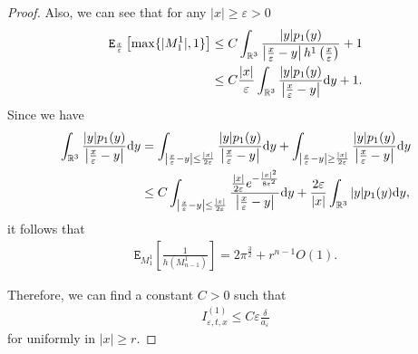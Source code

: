 \documentclass[10pt,a4paper]{amsart}
\newcommand{\R}{{\mathbb{R}}}
\newcommand{\dd}{\text{\rm d}}             %
\newcommand{\e}{\varepsilon}
\begin{document}
\begin{proof}
Also, we can see that for any $|x|\geq \e>0$ \begin{align*}
\mathtt{E}_{\frac{x}{\e}}\left[\max\{|M_1^1|,1\}\right]&\leq C\int_{\R^3}\frac{|y|p_1(y)}{\left|\frac{x}{\e}-y\right|h^1\left(\frac{x}{\e}\right)}+1\\
&\leq C\frac{|x|}{\e}\int_{\R^3}\frac{|y|p_1(y)}{\left|\frac{x}{\e}-y\right|}\dd y+1.
\end{align*}
Since we have \begin{align*}
\int_{\R^3}\frac{|y|p_1(y)}{\left|\frac{x}{\e}-y\right|}\dd y&=\int_{\left|\frac{x}{\e}-y\right|\leq \frac{|x|}{2\e}}\frac{|y|p_1(y)}{\left|\frac{x}{\e}-y\right|}\dd y+\int_{\left|\frac{x}{\e}-y\right|\geq \frac{|x|}{2\e}}\frac{|y|p_1(y)}{\left|\frac{x}{\e}-y\right|}\dd y\\
&\leq C\int_{\left|\frac{x}{\e}-y\right|\leq \frac{|x|}{2\e}}\frac{\frac{|x|}{2\e}e^{-\frac{|x|^2}{8\e^2}}}{\left|\frac{x}{\e}-y\right|}\dd y+\frac{2\e}{|x|}\int_{\R^3}|y|p_1(y)\dd y,
\end{align*}
it follows that \begin{align}
\mathtt{E}_{M_1^1}\left[\frac{1}{h(M_{n-1}^{1})}\right]=2\pi^\frac{3}{2}+r^{n-1}O(1).\label{eq:h(S)exp}
\end{align} 

Therefore, we can find a constant $C>0$ such that \begin{align*}
I_{\e,t,x}^{(1)}\leq C\e \frac{\delta}{a_\e}
\end{align*}
for uniformly in $|x|\geq r$.









\end{proof}
\end{document}
